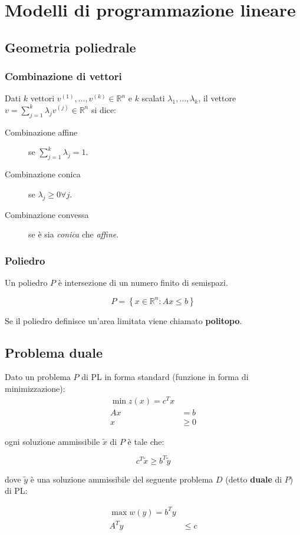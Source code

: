 \documentclass[\main/main.tex]{subfiles}
\begin{document}
\chapter{Modelli di programmazione lineare}

\section{Geometria poliedrale}

\subsection{Combinazione di vettori}
Dati $k$ vettori $v^{(1)},\ldots,v^{(k)} \in \mathbb{R}^n$ e $k$ scalati $\lambda_1,\ldots,\lambda_k$, il vettore $v = \sum_{j=1}^k \lambda_j v^{(j)} \in \mathbb{R}^n$ si dice:

\begin{description}
  \item[Combinazione affine] se $\sum_{j=1}^k \lambda_j = 1$.
  \item[Combinazione conica] se $\lambda_j \geq 0 \forall j$.
  \item[Combinazione convessa] se è sia \textit{conica} che \textit{affine}.
\end{description}

\subsection{Poliedro}
Un poliedro $P$ è intersezione di un numero finito di semispazi.

\[
  P = \left\{ x \in \mathbb{R}^n: Ax \leq b \right\}
\]

Se il poliedro definisce un'area limitata viene chiamato \textbf{politopo}.

\section{Problema duale}
\begin{theorem}
  Dato un problema $P$ di PL in forma standard (funzione in forma di minimizzazione):
  \begin{align*}
    \min z(x) = c^T x \\
    Ax & = b          \\
    x  & \geq 0
  \end{align*}

  ogni soluzione ammissibile $\tilde{x}$ di $P$ è tale che:

  \[
    c^T\tilde{x} \geq b^T \tilde{y}
  \]

  dove $\tilde{y}$ è una soluzione ammissibile del seguente problema $D$ (detto \textbf{duale} di $P$) di PL:

  \begin{align*}
    \max w(y) = b^T y \\
    A^Ty & \leq c
  \end{align*}
\end{theorem}
\end{document}
